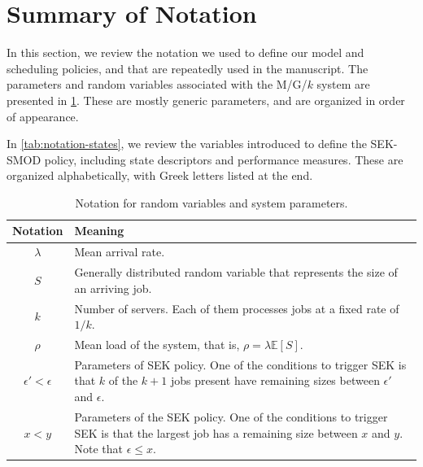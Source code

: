 \documentclass[acmsmall]{acmart}
\newcommand{\E}[1]{\mathbb{E}[#1]}
\begin{document}



\newpage
\appendix


\section{Summary of Notation}
\label{ap:notation}

In this section, we review the notation we used to define our model and scheduling policies, and that are repeatedly used in the manuscript. The parameters and random variables associated with the M/G/$k$ system are presented in \cref{tab:notation-parameters}. These are mostly generic parameters, and are organized in order of appearance. 

In \cref{tab:notation-states}, we review the variables introduced to define the SEK-SMOD policy, including state descriptors and performance measures. These are organized alphabetically, with Greek letters listed at the end.

\renewcommand{\arraystretch}{1.2}
\begin{table}
  \caption{Notation for random variables and system parameters.}
  \label{tab:notation-parameters}
  \begin{tabular}{cp{10cm}}
    \toprule
    Notation & Meaning \\
    \midrule
    $\lambda$ & Mean arrival rate. \\
    $S$ & Generally distributed random variable that represents the size of an arriving job. \\
    $k$ & Number of servers. Each of them processes jobs at a fixed rate of $1/k$. \\
    $\rho$ & Mean load of the system, that is, $\rho=\lambda\E{S}$. \\
    $\epsilon'<\epsilon$ & Parameters of SEK policy. One of the conditions to trigger SEK is that $k$ of the $k+1$ jobs present have remaining sizes between $\epsilon'$ and $\epsilon$. \\
    $x<y$ & Parameters of the SEK policy. One of the conditions to trigger SEK is that the largest job has a remaining size between $x$ and $y$. Note that $\epsilon \leq x$. \\
    \bottomrule
  \end{tabular}
\end{table}
\end{document}
